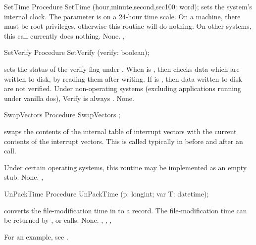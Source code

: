 \begin{procedure}{SetTime}
\Declaration
Procedure SetTime (hour,minute,second,sec100: word);
\Description
{} sets the system's internal clock. The  parameter is
on a 24-hour time scale.
\Portability
On a \linux machine, there must be root privileges, otherwise this
routine will do nothing. On other \unix systems, this call currently
does nothing.
\Errors
None.
\SeeAlso
{}, 
\end{procedure}
\begin{procedure}{SetVerify}
\Declaration
Procedure SetVerify (verify: boolean);
\Description

 sets the status of the verify flag under \dos. When
 is , then \dos checks data which are written to disk,
by reading them after writing. If  is , then data
written to disk are not verified.
\Portability
Under non-\dos operating systems (excluding \ostwo applications running
under vanilla dos), Verify is always .
\Errors
None.
\SeeAlso
{}
\end{procedure}
\begin{procedure}{SwapVectors}
\Declaration
Procedure SwapVectors ;
\Description

 swaps the contents of the internal table of interrupt 
vectors with the current contents of the interrupt vectors.
This is called typically in before and after an  call.

\Portability
Under certain operating systems, this routine may be implemented
as an empty stub.
\Errors
None.
\SeeAlso
{}, 
\end{procedure}
\begin{procedure}{UnPackTime}
\Declaration
Procedure UnPackTime (p: longint; var T: datetime);
\Description

 converts the file-modification time in 
to a  record. The file-modification time can be 
returned by ,  or  calls.
\Errors
None.
\SeeAlso
{}, , , 
\end{procedure}
For an example, see .


